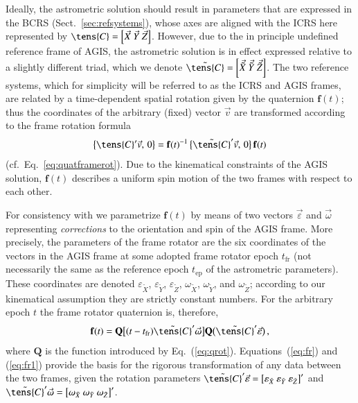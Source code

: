 \documentclass[structabstract]{aa}
\newcommand{\quat}[1]{\mathbf{#1}}
\begin{document}
Ideally, the astrometric solution should result in parameters that are expressed
in the BCRS (Sect.~\ref{sec:refsystems}), whose axes are aligned with the ICRS
here represented by $\tens{C}=\left[ \vec{X}~\vec{Y}~\vec{Z} \right]$. 
However, due to the in 
principle undefined reference frame of AGIS, the astrometric solution is 
in effect expressed relative to a slightly different triad, which we denote 
$\tilde{\tens{C}}=\left[ \vec{\tilde{X}}~\vec{\tilde{Y}}~\vec{\tilde{Z}} \right]$. 
The two reference systems, which for simplicity will be referred to as the 
ICRS and AGIS frames, are related by a time-dependent spatial rotation given 
by the quaternion $\quat{f}(t)$; thus the coordinates of the arbitrary (fixed) 
vector $\vec{v}$ are transformed according to the frame rotation formula
\begin{equation}\label{eq:fr}
\left\{\tens{C}'\vec{v},\,0\right\} = \quat{f}(t)^{-1}
\,\big\{\tilde{\tens{C}}'\vec{v},\,0\big\}\, \quat{f}(t) 
\end{equation} 
(cf.\ Eq.~\ref{eq:quatframerot}). Due to the kinematical constraints of 
the AGIS solution, $\quat{f}(t)$ describes a uniform spin motion of 
the two frames with respect to each other.

For consistency with \citet{ndac1995} we parametrize $\quat{f}(t)$
by means of two vectors $\vec{\varepsilon}$ and $\vec{\omega}$ representing
\emph{corrections} to the orientation and spin of the AGIS frame. More precisely,
the parameters of the frame rotator are the six coordinates of the vectors in
the AGIS frame at some adopted frame rotator epoch $t_\text{fr}$ (not 
necessarily the same as the reference epoch $t_\text{ep}$ of the astrometric 
parameters). These coordinates are denoted $\varepsilon_{\tilde{X}}$, 
$\varepsilon_{\tilde{Y}}$, $\varepsilon_{\tilde{Z}}$, $\omega_{\tilde{X}}$, 
$\omega_{\tilde{Y}}$, and $\omega_{\tilde{Z}}$; according to our kinematical
assumption they are strictly constant numbers.
For the arbitrary epoch $t$ the frame rotator quaternion is, therefore, 
\begin{equation}\label{eq:fr1}
\quat{f}(t) = \quat{Q}\big[(t-t_\text{fr})\tilde{\tens{C}}'\vec{\omega}\big]
\quat{Q}\big(\tilde{\tens{C}}'\vec{\varepsilon}\big) \, ,
\end{equation}
where $\quat{Q}$ is the function introduced by Eq.~(\ref{eq:qrot}).
Equations~(\ref{eq:fr}) and (\ref{eq:fr1}) provide the basis for the rigorous
transformation of any data between the two frames, given the rotation
parameters $\tilde{\tens{C}}'\vec{\varepsilon}=\left[
\varepsilon_{\tilde{X}}~\varepsilon_{\tilde{Y}}~\varepsilon_{\tilde{Z}}\right]'$ 
and $\tilde{\tens{C}}'\vec{\omega}=\left[
\omega_{\tilde{X}}~\omega_{\tilde{Y}}~\omega_{\tilde{Z}}\right]'$.
\end{document}
